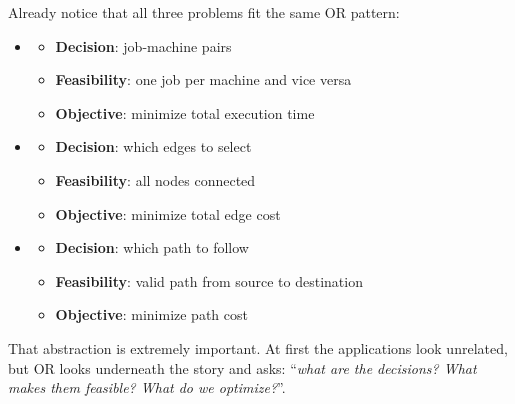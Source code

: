 \highspace
Already notice that all three problems fit the same OR pattern:
\begin{itemize}
    \item {}
        \begin{itemize}
            \item \textbf{Decision}: job-machine pairs
            \item \textbf{Feasibility}: one job per machine and vice versa
            \item \textbf{Objective}: minimize total execution time
        \end{itemize}
    \item {}
        \begin{itemize}
            \item \textbf{Decision}: which edges to select
            \item \textbf{Feasibility}: all nodes connected
            \item \textbf{Objective}: minimize total edge cost
        \end{itemize}
    \item {}
        \begin{itemize}
            \item \textbf{Decision}: which path to follow
            \item \textbf{Feasibility}: valid path from source to destination
            \item \textbf{Objective}: minimize path cost
        \end{itemize}
\end{itemize}
That abstraction is extremely important. At first the applications look unrelated, but OR looks underneath the story and asks: ``\emph{what are the decisions? What makes them feasible? What do we optimize?}''.

